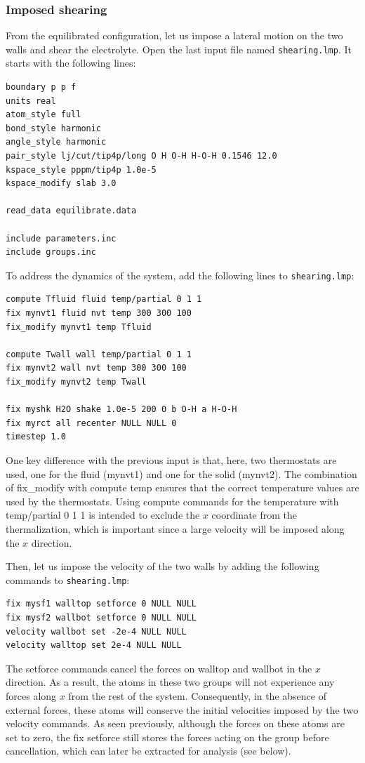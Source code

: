 \documentclass[9pt,tutorial]{livecoms}
\newcommand{\lmpcmd}[1]{\hspace{0pt}\colorbox{listing}{\textcolor{command}{\small{#1}}}\hspace{0pt}} %
\newcommand{\flecmd}[1]{\textcolor{command}{\texttt{#1}}} %
\begin{document}
\subsubsection{Imposed shearing}

From the equilibrated configuration, let us impose a lateral motion on the two
walls and shear the electrolyte.  Open the last input file named \flecmd{shearing.lmp}.
It starts with the following lines:
\begin{lstlisting}
boundary p p f
units real
atom_style full
bond_style harmonic
angle_style harmonic
pair_style lj/cut/tip4p/long O H O-H H-O-H 0.1546 12.0
kspace_style pppm/tip4p 1.0e-5
kspace_modify slab 3.0

read_data equilibrate.data

include parameters.inc
include groups.inc
\end{lstlisting}

To address the dynamics of the system, add the following lines to
\flecmd{shearing.lmp}:
\begin{lstlisting}
compute Tfluid fluid temp/partial 0 1 1
fix mynvt1 fluid nvt temp 300 300 100
fix_modify mynvt1 temp Tfluid

compute Twall wall temp/partial 0 1 1
fix mynvt2 wall nvt temp 300 300 100
fix_modify mynvt2 temp Twall

fix myshk H2O shake 1.0e-5 200 0 b O-H a H-O-H
fix myrct all recenter NULL NULL 0
timestep 1.0
\end{lstlisting}

One key difference with the previous input is that, here, two thermostats are used,
one for the fluid (\lmpcmd{mynvt1}) and one for the solid (\lmpcmd{mynvt2}).
The combination of \lmpcmd{fix\_modify} with \lmpcmd{compute temp} ensures
that the correct temperature values are used by the thermostats.  Using
\lmpcmd{compute} commands for the temperature with \lmpcmd{temp/partial 0 1 1} is
intended to exclude the $x$ coordinate from the thermalization, which is important since a
large velocity will be imposed along the $x$ direction.

Then, let us impose the velocity of the two walls by adding the following
commands to \flecmd{shearing.lmp}:
\begin{lstlisting}
fix mysf1 walltop setforce 0 NULL NULL
fix mysf2 wallbot setforce 0 NULL NULL
velocity wallbot set -2e-4 NULL NULL
velocity walltop set 2e-4 NULL NULL
\end{lstlisting}
The \lmpcmd{setforce} commands cancel the forces on \lmpcmd{walltop} and
\lmpcmd{wallbot} {\color{blue}in the $x$ direction}.  As a result, the atoms in these two groups will not
experience any forces {\color{blue}along $x$} from the rest of the system.  Consequently, in the absence of
external forces, these atoms will conserve the initial velocities imposed by the
two \lmpcmd{velocity} commands.  {\color{blue}As seen previously, although the
forces on these atoms are set to zero, the \lmpcmd{fix setforce} still stores the
forces acting on the group before cancellation, which can later be extracted
for analysis (see below).}
\end{document}
